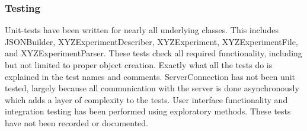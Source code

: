 \subsubsection{Testing}

Unit-tests have been written for nearly all underlying classes. This includes JSONBuilder, XYZExperimentDescriber, XYZExperiment, XYZExperimentFile, and XYZExperimentParser. These tests check all required functionality, including but not limited to proper object creation. Exactly what all the tests do is explained in the test names and comments. ServerConnection has not been unit tested, largely because all communication with the server is done asynchronously which adds a layer of complexity to the tests. User interface functionality and integration testing has been performed using exploratory methods. These tests have not been recorded or documented.